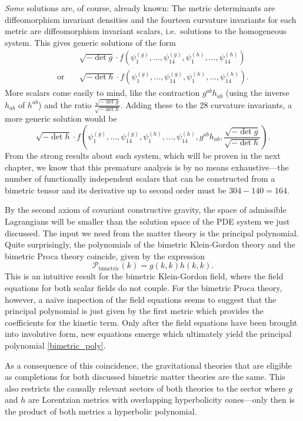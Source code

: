 \emph{Some} solutions are, of course, already known: The metric determinants are diffeomorphism invariant densities and the fourteen curvature invariants for each metric are diffeomorphism invariant scalars, i.e.\ solutions to the homogeneous system. This gives generic solutions of the form
\begin{equation}
  \begin{aligned}
  {}& \sqrt{-\operatorname{det}g}\cdot f(\psi^{(g)}_1,\dots,\psi^{(g)}_{14},\psi^{(h)}_1,\dots,\psi^{(h)}_{14}) \\
    \text{or}\quad{}& \sqrt{-\operatorname{det}h}\cdot f(\psi^{(g)}_1,\dots,\psi^{(g)}_{14},\psi^{(h)}_1,\dots,\psi^{(h)}_{14}).
  \end{aligned}
\end{equation}
More scalars come easily to mind, like the contraction $g^{ab} h_{ab}$ (using the inverse $h_{ab}$ of $h^{ab}$) and the ratio $\frac{\sqrt{-\operatorname{det}g}}{\sqrt{-\operatorname{det}h}}$. Adding these to the 28 curvature invariants, a more generic solution would be
\begin{equation}
  \sqrt{-\operatorname{det}h}\cdot f(\psi^{(g)}_1,\dots,\psi^{(g)}_{14},\psi^{(h)}_1,\dots,\psi^{(h)}_{14},g^{ab}h_{ab}, \frac{\sqrt{-\operatorname{det}g}}{\sqrt{-\operatorname{det}h}}).
\end{equation}
From the strong results about such system, which will be proven in the next chapter, we know that this premature analysis is by no means exhaustive---the number of functionally independent scalars that can be constructed from a bimetric tensor and its derivative up to second order must be $304-140=164$.

By the second axiom of covariant constructive gravity, the space of admissible Lagrangians will be smaller than the solution space of the PDE system we just discussed. The input we need from the matter theory is the principal polynomial. Quite surprisingly, the polynomials of the bimetric Klein-Gordon theory and the bimetric Proca theory coincide, given by the expression
\begin{equation}\label{bimetric_poly}
  \mathcal P_\text{bimetric}(k) = g(k,k) h(k,k).
\end{equation}
This is an intuitive result for the bimetric Klein-Gordon field, where the field equations for both scalar fields do not couple. For the bimetric Proca theory, however, a na\"ive inspection of the field equations seems to suggest that the principal polynomial is just given by the first metric which provides the coefficients for the kinetic term. Only after the field equations have been brought into involutive form, new equations emerge which ultimately yield the principal polynomial \eqref{bimetric_poly}. \cite{Wierzba_2018}

As a consequence of this coincidence, the gravitational theories that are eligible as completions for both discussed bimetric matter theories are the same. This also restricts the causally relevant sectors of both theories to the sector where $g$ and $h$ are Lorentzian metrics with overlapping hyperbolicity cones---only then is the product of both metrics a hyperbolic polynomial.

